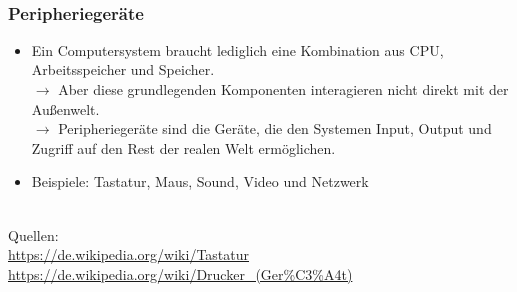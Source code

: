 %
~\\
\begin{minipage}[t]{0.7\textwidth}
	\subsubsection{Peripheriegeräte}
	\begin{itemize}
		\item Ein Computersystem braucht lediglich eine Kombination aus CPU, Arbeitsspeicher und Speicher. \\
		$\rightarrow$ Aber diese grundlegenden Komponenten interagieren nicht direkt mit der Außenwelt.\\
		$\rightarrow$ Peripheriegeräte sind die Geräte, die den Systemen Input, Output und Zugriff auf den Rest der realen Welt ermöglichen.
		\item Beispiele: Tastatur, Maus, Sound, Video und Netzwerk
	\end{itemize}
\end{minipage}
\begin{minipage}[t]{0.3\textwidth}
	\centering
	~\\
	\tiny
	Quellen:\\ \url{https://de.wikipedia.org/wiki/Tastatur}\\
	\url{https://de.wikipedia.org/wiki/Drucker_(Ger\%C3\%A4t)}
\end{minipage}
~\\~\\
